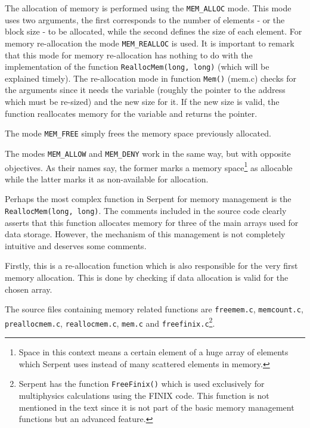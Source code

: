 \documentclass[twoside,a4paper,12pt,english,draft]{anstrans}
\begin{document}
The allocation of memory is performed using the \texttt{MEM\_ALLOC} mode. This mode uses two arguments, the first
corresponds to the number of elements - or the block size - to be allocated, while the second defines the size of each element.
For memory re-allocation the mode \texttt{MEM\_REALLOC} is used. It is important to remark that this mode for memory re-allocation
has nothing to do with the implementation of the function \texttt{ReallocMem(long, long)} (which will be explained timely). The re-allocation mode
in function \texttt{Mem()} (mem.c) checks for the arguments since it needs the variable (roughly the pointer to the address which must
be re-sized) and the new size for it. If the new size is valid, the function reallocates memory for the variable and returns the pointer.

%

The mode \texttt{MEM\_FREE} simply frees the memory space previously allocated.

The modes \texttt{MEM\_ALLOW} and \texttt{MEM\_DENY} work in the same way, but with opposite objectives. As
their names say, the former marks a memory space\footnote{Space in this context means a certain element of a huge array
of elements which Serpent uses instead of many scattered elements in memory.} as allocable while the latter marks it as non-available
for allocation.

Perhaps the most complex function in Serpent for memory management is the \texttt{ReallocMem(long, long)}.
The comments included in the source code clearly asserts that this function allocates memory for
three of the main arrays used for data storage. However, the mechanism of this management is not
completely intuitive and deserves some comments.

Firstly, this is a re-allocation function which is also responsible for the very first memory
allocation. This is done by checking if data allocation is valid for the chosen array.

The source files containing memory related functions are \texttt{freemem.c},
\texttt{memcount.c}, \texttt{preallocmem.c}, \texttt{reallocmem.c}, \texttt{mem.c}
and \texttt{freefinix.c}\footnote{Serpent has the function \texttt{FreeFinix()} which
  is used exclusively for multiphysics calculations using the FINIX code. This function
  is not mentioned in the text since it is not part of the basic memory management functions
  but an advanced feature.}.
\end{document}
